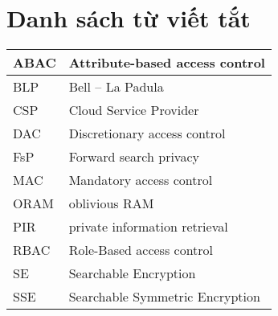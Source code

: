 \chapter*{\centering\Large{Danh sách từ viết tắt}}
\begin{tabular}{| p{} |p{} |}
\hline
        ABAC &  Attribute-based access control\\
        \hline
        BLP & Bell – La Padula \\
        \hline
        CSP & Cloud Service Provider \\
        \hline
        DAC & Discretionary access control \\
        \hline
        FsP & Forward search privacy  \\
        \hline
        MAC & Mandatory access control \\
        \hline
        ORAM & oblivious RAM \\
        \hline
        PIR & private information retrieval \\
        \hline
        RBAC & Role-Based access control  \\
        \hline
        SE & Searchable Encryption  \\
        \hline
        SSE & Searchable Symmetric Encryption \\
        \hline
\end{tabular} \\


